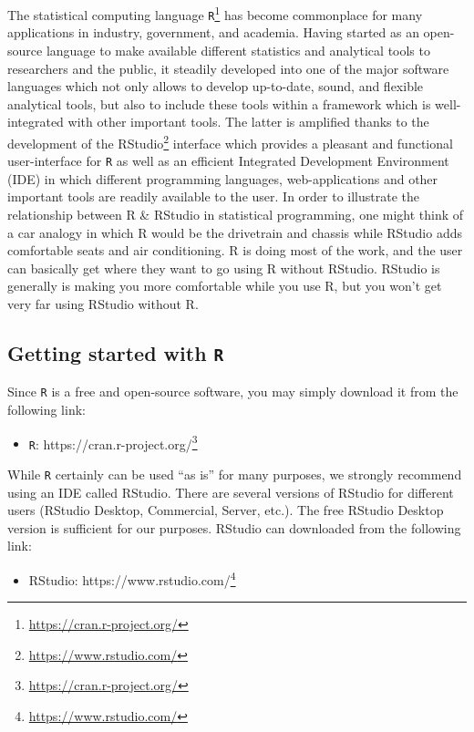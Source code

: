 \documentclass[12pt,]{krantz}
\providecommand{\tightlist}{%
  \setlength{\itemsep}{0pt}\setlength{\parskip}{0pt}}
\renewcommand{\href}[2]{#2\footnote{\url{#1}}}
\begin{document}
The statistical computing language
\href{https://cran.r-project.org/}{\texttt{R}} has become commonplace
for many applications in industry, government, and academia. Having
started as an open-source language to make available different
statistics and analytical tools to researchers and the public, it
steadily developed into one of the major software languages which not
only allows to develop up-to-date, sound, and flexible analytical tools,
but also to include these tools within a framework which is
well-integrated with other important tools. The latter is amplified
thanks to the development of the
\href{https://www.rstudio.com/}{RStudio} interface which provides a
pleasant and functional user-interface for \texttt{R} as well as an
efficient Integrated Development Environment (IDE) in which different
programming languages, web-applications and other important tools are
readily available to the user. In order to illustrate the relationship
between R \& RStudio in statistical programming, one might think of a
car analogy in which R would be the drivetrain and chassis while RStudio
adds comfortable seats and air conditioning. R is doing most of the
work, and the user can basically get where they want to go using R
without RStudio. RStudio is generally is making you more comfortable
while you use R, but you won't get very far using RStudio without R.

\subsection{\texorpdfstring{Getting started with
\texttt{R}}{Getting started with R}}\label{getting-started-with-r}

Since \texttt{R} is a free and open-source software, you may simply
download it from the following link:

\begin{itemize}
\tightlist
\item
  \href{https://cran.r-project.org/}{\texttt{R}:
  https://cran.r-project.org/}
\end{itemize}

While \texttt{R} certainly can be used ``as is'' for many purposes, we
strongly recommend using an IDE called RStudio. There are several
versions of RStudio for different users (RStudio Desktop, Commercial,
Server, etc.). The free RStudio Desktop version is sufficient for our
purposes. RStudio can downloaded from the following link:

\begin{itemize}
\tightlist
\item
  \href{https://www.rstudio.com/}{RStudio: https://www.rstudio.com/}
\end{itemize}
\end{document}
